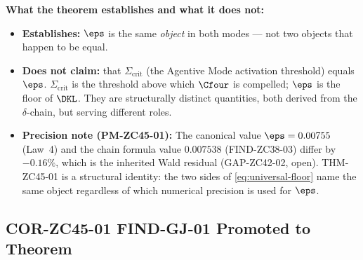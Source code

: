 \documentclass[12pt, a4paper]{article}
\begin{document}
\begin{formalbox}[title={THM-ZC45-01: Universal Floor ---
  $\varepsilon_{0,\mathrm{Spont}} = \varepsilon_{0,\mathrm{Agent}}
  = \varepsilon_0$ (Theorem)}]
\textbf{What the theorem establishes and what it does not:}
\begin{itemize}[leftmargin=*, noitemsep, itemsep=2pt]
\item \textbf{Establishes:} $\eps$ is the same \emph{object}
  in both modes --- not two objects that happen to be equal.
\item \textbf{Does not claim:} that $\Sigma_{\mathrm{crit}}$
  (the Agentive Mode activation threshold) equals $\eps$.
  $\Sigma_{\mathrm{crit}}$ is the threshold above which
  $\Cfour$ is compelled; $\eps$ is the floor of $\DKL$.
  They are structurally distinct quantities, both derived from
  the $\delta$-chain, but serving different roles.
\item \textbf{Precision note (PM-ZC45-01):} The canonical
  value $\eps = 0.00755$ (Law~4) and the chain formula value
  $0.007538$ (FIND-ZC38-03) differ by $-0.16\%$, which is
  the inherited Wald residual (GAP-ZC42-02, open).
  THM-ZC45-01 is a structural identity: the two sides of
  \eqref{eq:universal-floor} name the same object regardless
  of which numerical precision is used for $\eps$.
\end{itemize}
\end{formalbox}

\subsection{COR-ZC45-01 \quad FIND-GJ-01 Promoted to Theorem}

\end{document}
